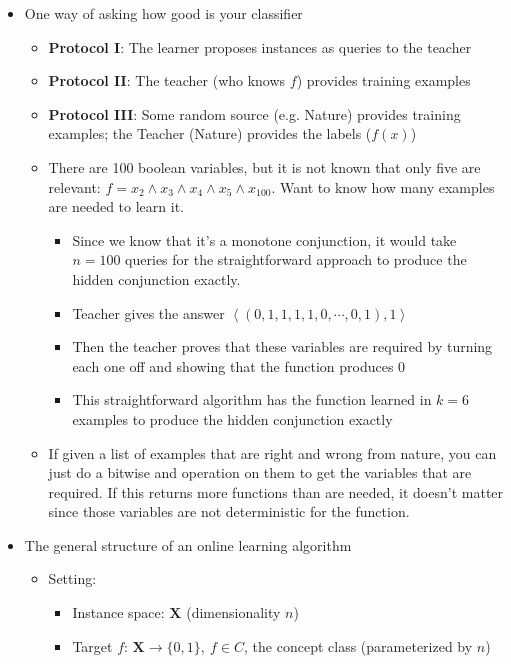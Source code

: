 \documentclass{article}
\begin{document}
\hspace{-1.5em}{\large \bf Mistake Bound Learning}
\begin{itemize}
\item One way of asking how good is your classifier
	\begin{itemize}
	\item {\bf Protocol I}: The learner proposes instances as queries to the teacher
        \item {\bf Protocol II}: The teacher (who knows $f$) provides training examples
        \item {\bf Protocol III}: Some random source (e.g. Nature) provides training examples; the Teacher (Nature) provides the labels ($f(x)$)
        \item There are 100 boolean variables, but it is not known that only five are relevant: $f = x_{2}\wedge x_{3}\wedge x_{4} \wedge x_{5}\wedge x_{100}$. Want to know how many examples are needed to learn it.
          \begin{itemize}
            \item Since we know that it's a monotone conjunction, it would take $n=100$ queries for the straightforward approach to produce the hidden conjunction exactly.
            \item Teacher gives the answer $\left<(0,1,1,1,1,0,\cdots,0,1),1\right>$
            \item Then the teacher proves that these variables are required by turning each one off and showing that the function produces 0
            \item This straightforward algorithm has the function learned in $k=6$ examples to produce the hidden conjunction exactly
          \end{itemize}
          \item If given a list of examples that are right and wrong from nature, you can just do a bitwise and operation on them to get the variables that are required. If this returns more functions than are needed, it doesn't matter since those variables are not deterministic for the function. 
	\end{itemize}
\item The general structure of an online learning algorithm
	\begin{itemize}
	\item Setting:
          \begin{itemize}
            \item Instance space: $\mathbf{X}$ (dimensionality $n$)
            \item Target $f$: $\mathbf{X}\rightarrow\{0,1\},\ f\in C$, the concept class (parameterized by $n$)

\end{itemize}
\end{itemize}
\end{itemize}
\end{document}
